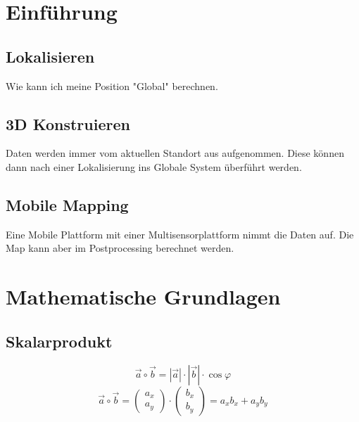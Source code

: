 	
\chapter{Einführung}
\label{Einführung}	

\section{Lokalisieren}
\label{einfuehrung:sec:lokalisieren}
	Wie kann ich meine Position "Global" berechnen.
	
\section{3D Konstruieren}
\label{einfuehrung:sec:3DKonstruieren}
	Daten werden immer vom aktuellen Standort aus aufgenommen. Diese können dann nach einer Lokalisierung ins 
	Globale System überführt werden.

\section{Mobile Mapping}
\label{einfuehrung:sec:MobileMapping}
	Eine Mobile Plattform mit einer Multisensorplattform nimmt die Daten auf. Die Map kann aber im Postprocessing berechnet werden.



\chapter{Mathematische Grundlagen}
\label{MathematischeGrundlagen}




\section{Skalarprodukt}

	\begin{equation}
		\vec{a} \circ \vec{b} = |\vec{a}| \cdot |\vec{b}| \cdot \cos\varphi 
	\end{equation}
	\begin{equation}
		\vec{a} \circ \vec{b} =
		\left(
		\begin{array}{c}
		a_{x} \\
		a_{y}
		\end{array}
		\right) 
		\cdot 
		\left(
		\begin{array}{c}
		b_{x} \\
		b_{y}
		\end{array}
		\right)
		=
		a_{x}b_{x}
		+
		a_{y}b_{y} 
	\end{equation}

